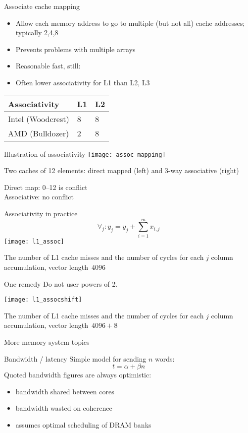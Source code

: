 \begin{frame}{Associate cache mapping}  
  \begin{itemize}
  \item Allow each memory address to go to multiple (but not all) cache addresses;
    typically 2,4,8
  \item Prevents problems with multiple arrays
  \item Reasonable fast, still:
  \item Often lower associativity for L1 than L2, L3
  \end{itemize}
  \begin{tabular}{|l|ll|}
    \toprule
    Associativity&L1&L2\\
    \midrule
    Intel (Woodcrest)&8&8\\
    AMD (Bulldozer)&2&8\\
    \bottomrule
  \end{tabular}
\end{frame}

\begin{frame}{Illustration of associativity}
\texttt{[image: assoc-mapping]}

Two caches of 12 elements: direct mapped (left) and 3-way associative (right)

Direct map: 0--12 is conflict\\ Associative: no conflict
\end{frame}

\begin{frame}{Associativity in practice}
\[ \forall_j\colon y_j= y_j+\sum_{i=1}^mx_{i,j} \]
  \texttt{[image: l1\_assoc]}

The number of L1 cache misses and the number of cycles for
    each $j$ column accumulation, vector length~$4096$
\end{frame}

\begin{frame}{One remedy}
Do not user powers of 2.

  \texttt{[image: l1\_assocshift]}

The number of L1 cache misses and the number of cycles for
    each $j$ column accumulation, vector length~$4096+8$
\end{frame}

 {More memory system topics}

\begin{frame}{Bandwidth / latency}
  Simple model for sending $n$ words: \[ t=\alpha + \beta n \]
  Quoted bandwidth figures are always optimistic:
  \begin{itemize}
  \item bandwidth shared between cores
  \item bandwidth wasted on coherence
  \item assumes optimal scheduling of DRAM banks
  \end{itemize}
\end{frame}

